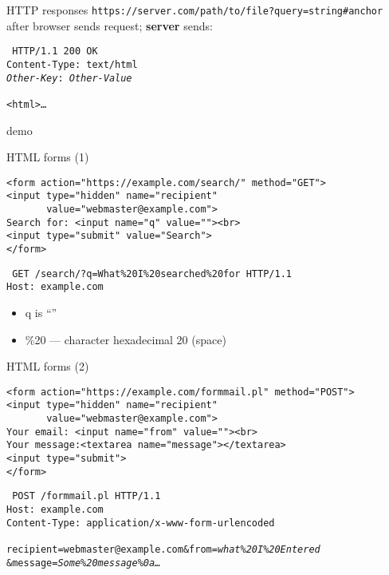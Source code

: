 \begin{frame}[fragile,label=HTTPResp]{HTTP responses}
\texttt{https://server.com/path/to/file?query=string\#anchor} \\
    after browser sends request; \textbf{server} sends:
\begin{framed}
\tt
HTTP/1.1 200 OK \\
Content-Type: text/html \\
\textit{Other-Key}:  \textit{Other-Value} \\
~ \\
<html>\ldots
\end{framed}
\end{frame}

\begin{frame}{demo}
\end{frame}

\begin{frame}[fragile,label=HTMLForms1]{HTML forms (1)}
\begin{verbatim}
<form action="https://example.com/search/" method="GET">
<input type="hidden" name="recipient"
       value="webmaster@example.com">
Search for: <input name="q" value=""><br>
<input type="submit" value="Search">
</form>
\end{verbatim}
\begin{framed}
\tt\small
GET /search/?q=What\%20I\%20searched\%20for HTTP/1.1 \\
Host: example.com
\end{framed}
    \begin{itemize}
        \item q is ``''
        \item \%20 --- character hexadecimal 20 (space)
    \end{itemize}
\end{frame}

\begin{frame}[fragile,label=HTMLForms2]{HTML forms (2)}
\begin{verbatim}
<form action="https://example.com/formmail.pl" method="POST">
<input type="hidden" name="recipient"
       value="webmaster@example.com">
Your email: <input name="from" value=""><br>
Your message:<textarea name="message"></textarea>
<input type="submit">
</form>
\end{verbatim}
\begin{framed}
\tt\small
POST /formmail.pl HTTP/1.1 \\
Host: example.com \\
Content-Type: application/x-www-form-urlencoded \\
~ \\
recipient=webmaster@example.com\&from=\textit{what\%20I\%20Entered}\\\&message=\textit{Some\%20message\%0a\ldots} \\
\end{framed}
\end{frame}


